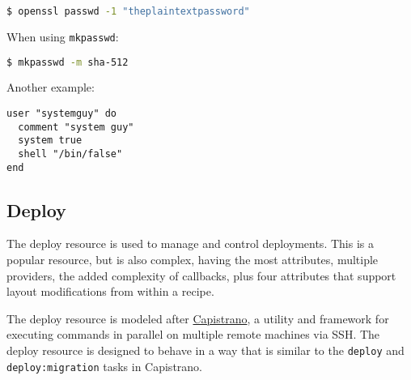 \begin{lstlisting}[language=Bash,label=lst:cookbook-resources-cookbook-user2]
$ openssl passwd -1 "theplaintextpassword"
\end{lstlisting}

When using \lstinline!mkpasswd!:

\begin{lstlisting}[language=Bash,label=lst:cookbook-resources-cookbook-user3]
$ mkpasswd -m sha-512
\end{lstlisting}

Another example:

\begin{lstlisting}[label=lst:cookbook-resources-cookbook-user4]
user "systemguy" do
  comment "system guy"
  system true
  shell "/bin/false"
end
\end{lstlisting}

\subsection{Deploy}

The deploy resource is used to manage and control deployments. This is a popular resource, but is also complex, having the most attributes, multiple providers, the added complexity of callbacks, plus four attributes that support layout modifications from within a recipe.

The deploy resource is modeled after \href{http://capistranorb.com/}{Capistrano}, a utility and framework for executing commands in parallel on multiple remote machines via SSH. The deploy resource is designed to behave in a way that is similar to the \lstinline!deploy! and \lstinline!deploy:migration! tasks in Capistrano.